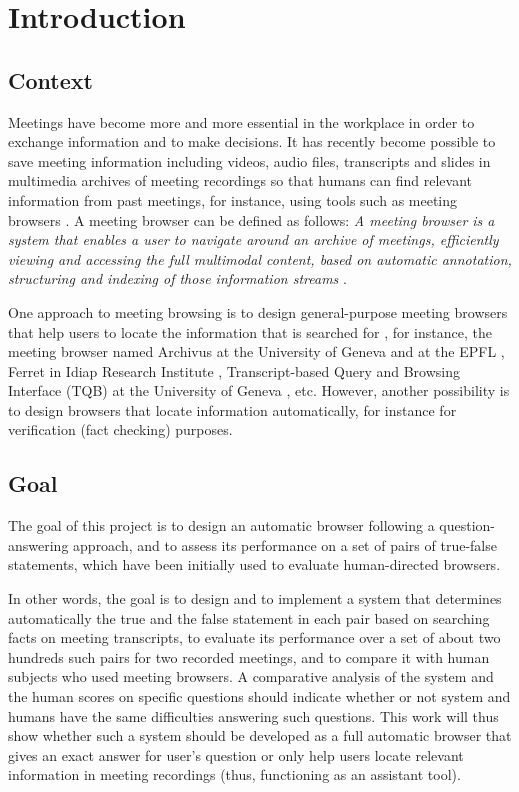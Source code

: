 \newpage
\chapter{Introduction}

\section{Context}
Meetings have become more and more essential in the workplace in order to exchange information and to make decisions. It has recently become possible to save meeting information including videos, audio files, transcripts and slides in multimedia archives of meeting recordings so that humans can find relevant information from past meetings, for instance, using tools such as meeting browsers \cite{popescubelis:tbe}.  A meeting browser can be defined as follows: \textit{A meeting browser is a system that enables a user to navigate around an archive of meetings, efficiently viewing and accessing the full multimodal content, based on automatic annotation, structuring and indexing of those information streams} \cite{mccowan2005amc}. 

One approach to meeting browsing is to design general-purpose meeting browsers that help users to locate the information that is searched for \cite{lalanne2005imm}, for instance, the meeting browser named Archivus at the University of Geneva and at the EPFL \cite{lisowska2004asa}, Ferret in Idiap Research Institute \cite{wellner2004brm}, Transcript-based Query and Browsing Interface (TQB) at the University of Geneva \cite{popescubelis:tam}, etc. However, another possibility is to design browsers that locate information automatically, for instance for verification (fact checking) purposes.

\section{Goal }

The goal of this project is to design an automatic browser following a question-answering approach, and to assess its performance on a set of pairs of true-false statements, which have been initially used to evaluate human-directed browsers.

In other words, the goal is to design and to implement a system that determines automatically the true and the false statement in each pair based on searching facts on meeting transcripts, to evaluate its performance over a set of about two hundreds such pairs for two recorded meetings, and to compare it with human subjects who used meeting browsers. A comparative analysis of the system and the human scores on specific questions should indicate whether or not system and humans have the same difficulties answering such questions. This work will thus show whether such a system should be developed as a full automatic browser that gives an exact answer for user's question or only help users locate relevant information in meeting recordings (thus, functioning as an assistant tool).

